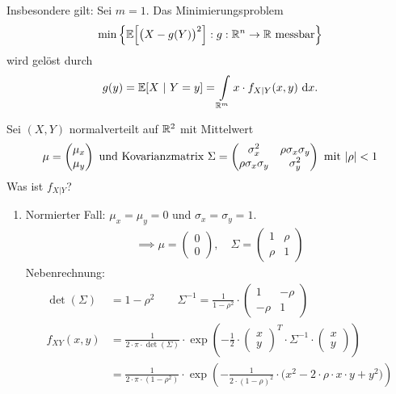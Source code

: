 Insbesondere gilt: Sei $m=1$. Das Minimierungsproblem 
\begin{align*}
\min\left\lbrace\E\Big[\big(X-g(Y)\big)^2\Big]:g:\R^n\to\R\text{  messbar}\right\rbrace
\end{align*}
wird gelöst durch
\begin{align*}
g(y)=\E[X~|~Y=y]=\int\limits_{\R^m} x\cdot f_{X|Y}(x,y)\d x.
\end{align*}

\begin{beisp}
Sei $(X,Y)$ normalverteilt auf $\R^2$ mit Mittelwert
\begin{align*}
\mu=\begin{pmatrix}
\mu_x\\ \mu_y
\end{pmatrix}\text{ und Kovarianzmatrix }
\Sigma=\begin{pmatrix}
\sigma_x^2 & \rho\sigma_x\sigma_y\\
\rho\sigma_x\sigma_y & \sigma_y^2
\end{pmatrix}\mit|\rho|<1
\end{align*}
Was ist $f_{X|Y}$?
\begin{enumerate}
\item Normierter Fall: $\mu_x=\mu_y=0$ und $\sigma_x=\sigma_y=1$.
\begin{align*}
\implies \mu=\begin{pmatrix}
0\\ 0
\end{pmatrix},\quad\Sigma=\begin{pmatrix}
1 & \rho\\
\rho & 1
\end{pmatrix}
\end{align*}
Nebenrechnung:
\begin{align*}
\det(\Sigma)&=1-\rho^2\qquad\Sigma^{-1}=\frac{1}{1-\rho^2}\cdot\begin{pmatrix}
1 & -\rho\\
-\rho & 1
\end{pmatrix}\\
f_{XY}(x,y)&=\frac{1}{2\cdot\pi\cdot\det(\Sigma)}\cdot\exp\left(-\frac{1}{2}\cdot\begin{pmatrix}
x\\ y
\end{pmatrix}^T\cdot\Sigma^{-1}\cdot\begin{pmatrix}
x\\ y
\end{pmatrix}\right)\\
&=\frac{1}{2\cdot\pi\cdot(1-\rho^2)}\cdot\exp\left(-\frac{1}{2\cdot(1-\rho)^2}\cdot\big(x^2-2\cdot\rho\cdot x\cdot y+y^2\big)\right)\\

\end{align*}
\end{enumerate}
\end{beisp}
